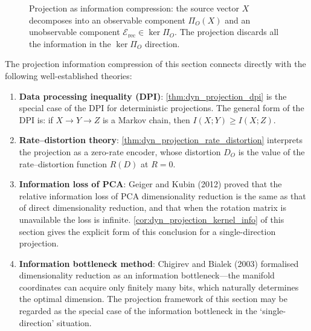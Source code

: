 \begin{figure}[htbp]
\centering
{}
\caption{Projection as information compression: the source vector $X$ decomposes into an observable component $\Pi_O(X)$ and an unobservable component $\mathcal E_{\text{rec}}\in\ker\Pi_O$. The projection discards all the information in the $\ker\Pi_O$ direction.}
\label{fig:projection_information_compression}
\end{figure}

\begin{remark}\label{rem:dyn_projection_info_interface}
The projection information compression of this section connects directly with the following well-established theories:
\begin{enumerate}[label=(\roman*)]
    \item \textbf{Data processing inequality (DPI)}: \cref{thm:dyn_projection_dpi} is the special case of the DPI for deterministic projections. The general form of the DPI is: if $X\to Y\to Z$ is a Markov chain, then $I(X;Y)\ge I(X;Z)$.
    \item \textbf{Rate--distortion theory}: \cref{thm:dyn_projection_rate_distortion} interprets the projection as a zero-rate encoder, whose distortion $D_O$ is the value of the rate--distortion function $R(D)$ at $R=0$.
    \item \textbf{Information loss of PCA}: Geiger and Kubin (2012) proved that the relative information loss of PCA dimensionality reduction is the same as that of direct dimensionality reduction, and that when the rotation matrix is unavailable the loss is infinite. \cref{cor:dyn_projection_kernel_info} of this section gives the explicit form of this conclusion for a single-direction projection.
    \item \textbf{Information bottleneck method}: Chigirev and Bialek (2003) formalised dimensionality reduction as an information bottleneck---the manifold coordinates can acquire only finitely many bits, which naturally determines the optimal dimension. The projection framework of this section may be regarded as the special case of the information bottleneck in the `single-direction' situation.
\end{enumerate}
\end{remark}

